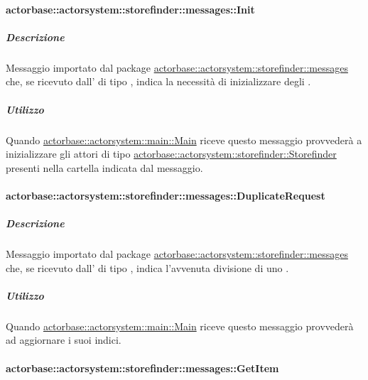 \documentclass{scalatekids-article}
\begin{document}
\paragraph{actorbase::actorsystem::storefinder::messages::Init}
\label{sec:actorbase::actorsystem::storefinder::messages::Init}

\subparagraph{Descrizione}

Messaggio importato dal package \hyperref[sec:actorbase::actorsystem::storefinder::messages]{actorbase::\allowbreak{}actorsystem::\allowbreak{}storefinder::\allowbreak{}messages}
che, se ricevuto dall' di tipo ,
indica la necessità di inizializzare degli .

\subparagraph{Utilizzo}

Quando \hyperref[sec:actorbase::actorsystem::main::Main]{actorbase::\allowbreak{}actorsystem::\allowbreak{}main::\allowbreak{}Main}
riceve questo messaggio provvederà a inizializzare gli attori di tipo
\hyperref[sec:actorbase::actorsystem::storefinder::Storefinder]{actorbase::\allowbreak{}actorsystem::\allowbreak{}storefinder::\allowbreak{}Storefinder}
presenti nella cartella indicata dal messaggio.

\paragraph{actorbase::actorsystem::storefinder::messages::DuplicateRequest}
\label{sec:actorbase::actorsystem::storefinder::messages::DuplicateRequest}

\subparagraph{Descrizione}

Messaggio importato dal package \hyperref[sec:actorbase::actorsystem::storefinder::messages]{actorbase::\allowbreak{}actorsystem::\allowbreak{}storefinder::\allowbreak{}messages}
che, se ricevuto dall' di tipo ,
indica l'avvenuta divisione di uno .

\subparagraph{Utilizzo}

Quando \hyperref[sec:actorbase::actorsystem::main::Main]{actorbase::\allowbreak{}actorsystem::\allowbreak{}main::\allowbreak{}Main}
riceve questo messaggio provvederà ad aggiornare i suoi indici.

\paragraph{actorbase::actorsystem::storefinder::messages::GetItem}
\label{sec:actorbase::actorsystem::storefinder::messages::GetItem}
\end{document}

